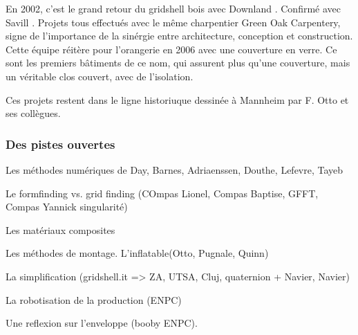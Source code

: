 En 2002, c'est le grand retour du gridshell bois avec Downland \cite{Harris2003}. Confirmé avec Savill \cite{Harris2008}. Projets tous effectués avec le même charpentier Green Oak Carpentery, signe de l'importance de la sinérgie entre architecture, conception et construction. Cette équipe réitère pour l'orangerie en 2006 avec une couverture en verre. Ce sont les premiers bâtiments de ce nom, qui assurent plus qu'une couverture, mais un véritable clos couvert, avec de l'isolation.

Ces projets restent dans le ligne historiuque dessinée à Mannheim par F. Otto et ses collègues.

\subsubsection{Des pistes ouvertes}

Les méthodes numériques de Day, Barnes, Adriaenssen, Douthe, Lefevre, Tayeb

Le formfinding vs. grid finding (COmpas Lionel, Compas Baptise, GFFT, Compas Yannick singularité)

Les matériaux composites

Les méthodes de montage. L'inflatable(Otto, Pugnale, Quinn)

La simplification (gridshell.it => ZA, UTSA, Cluj, quaternion + Navier, Navier)

La robotisation de la production (ENPC)

Une reflexion sur l'enveloppe (booby ENPC).










